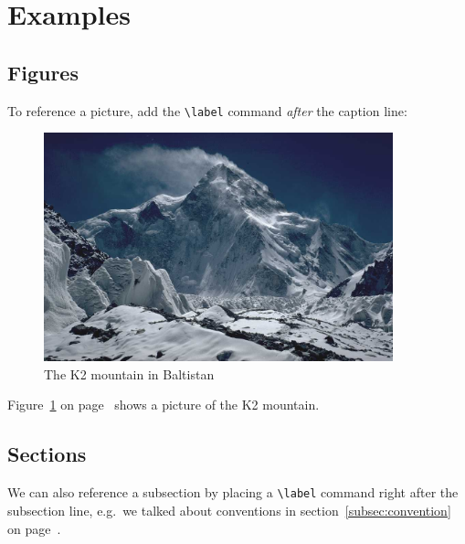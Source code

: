 \documentclass[a4paper,12pt]{article}
\begin{document}
\section{Examples}

\subsection{Figures}
To reference a picture, add the \verb|\label| command \emph{after} the caption line:
\begin{figure}[H]
  \centering
  \includegraphics[width=0.9\textwidth]{k2.jpg}
  \caption{The K2 mountain in Baltistan}
  \label{fig:k2}
\end{figure}

Figure~\ref{fig:k2} on page~\pageref{fig:k2} shows a picture of the K2 mountain.

\subsection{Sections}
We can also reference a subsection by placing a \verb|\label| command right after the subsection line, e.g.\ we talked about conventions in section~\ref{subsec:convention} on page~\pageref{subsec:convention}.
\end{document}
